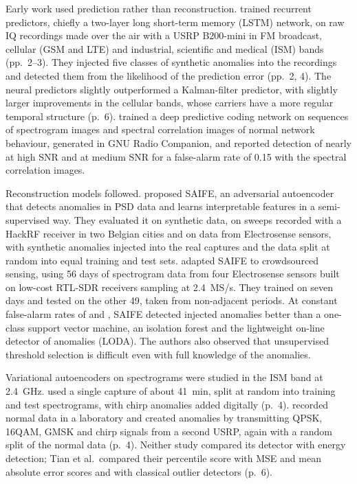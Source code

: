 Early work used prediction rather than reconstruction. \Textcite{oshea2016} trained recurrent predictors, chiefly a two-layer long short-term memory (LSTM) network, on raw IQ recordings made over the air with a USRP B200-mini in FM broadcast, cellular (GSM and LTE) and industrial, scientific and medical (ISM) bands (pp.~2--3). They injected five classes of synthetic anomalies into the recordings and detected them from the likelihood of the prediction error (pp.~2, 4). The neural predictors slightly outperformed a Kalman-filter predictor, with slightly larger improvements in the cellular bands, whose carriers have a more regular temporal structure (p.~6). \Textcite{tandiya2018} trained a deep predictive coding network on sequences of spectrogram images and spectral correlation images of normal network behaviour, generated in GNU Radio Companion, and reported detection of nearly  at high SNR and  at medium SNR for a false-alarm rate of 0.15 with the spectral correlation images.

Reconstruction models followed. \Textcite{rajendran2019} proposed SAIFE, an adversarial autoencoder that detects anomalies in PSD data and learns interpretable features in a semi-supervised way. They evaluated it on synthetic data, on sweeps recorded with a HackRF receiver in two Belgian cities and on data from Electrosense sensors, with synthetic anomalies injected into the real captures and the data split at random into equal training and test sets. \Textcite{rajendran2020} adapted SAIFE to crowdsourced sensing, using 56 days of spectrogram data from four Electrosense sensors built on low-cost RTL-SDR receivers sampling at \qty{2.4}{MS/s}. They trained on seven days and tested on the other 49, taken from non-adjacent periods. At constant false-alarm rates of  and , SAIFE detected injected anomalies better than a one-class support vector machine, an isolation forest and the lightweight on-line detector of anomalies (LODA). The authors also observed that unsupervised threshold selection is difficult even with full knowledge of the anomalies.

Variational autoencoders on spectrograms were studied in the ISM band at \qty{2.4}{\giga\hertz}. \Textcite{xu2021} used a single capture of about \qty{41}{\minute}, split at random into training and test spectrograms, with chirp anomalies added digitally (p.~4). \Textcite{tian2022} recorded normal data in a laboratory and created anomalies by transmitting QPSK, 16QAM, GMSK and chirp signals from a second USRP, again with a random split of the normal data (p.~4). Neither study compared its detector with energy detection; Tian et al.\ compared their percentile score with MSE and mean absolute error scores and with classical outlier detectors (p.~6).

